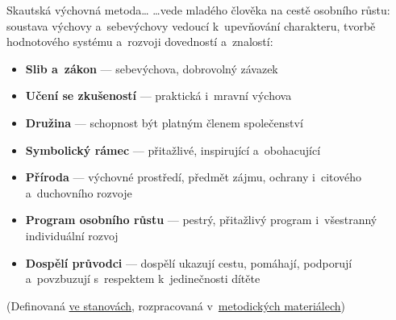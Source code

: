 \documentclass[compress, ucs, xelatex, xcolor=dvipsnames, print,
  hyperref={
    bookmarks=true,
    unicode=true,
    colorlinks=true,
    plainpages=false,
    pdfkeywords={Skaut, Junak, Skauting, Vychovna metoda},
    linkcolor=Black,
    anchorcolor=Black,
    citecolor=OliveGreen,
    filecolor=OliveGreen,
    menucolor=Black,
    urlcolor=OliveGreen,
    pdftex}
  ]{beamer}
\begin{document}
\begin{frame}{Skautská výchovná metoda\ldots}
  \ldots vede mladého člověka na cestě osobního růstu: soustava výchovy a~sebevýchovy vedoucí k~upevňování charakteru, tvorbě hodnotového systému a~rozvoji dovedností a~znalostí:
  \begin{itemize}
    \item \textbf{Slib a~zákon} --- sebevýchova, dobrovolný závazek
    \item \textbf{Učení se zkušeností} --- praktická i~mravní výchova
    \item \textbf{Družina} --- schopnost být platným členem společenství
    \item \textbf{Symbolický rámec} --- přitažlivé, inspirující a~obohacující
    \item \textbf{Příroda} --- výchovné prostředí, předmět zájmu, ochrany i~citového a~duchovního rozvoje
    \item \textbf{Program osobního růstu} --- pestrý, přitažlivý program i~všestranný individuální rozvoj
    \item \textbf{Dospělí průvodci} --- dospělí ukazují cestu, pomáhají, podporují a~povzbuzují s~respektem k~jedinečnosti dítěte
  \end{itemize}
  \begin{tiny}
    (Definovaná \href{https://krizovatka.skaut.cz/stredisko/administrativa/novy-obcansky-zakonik-stanovy/nove-stanovy}{ve stanovách}, rozpracovaná v~\href{https://krizovatka.skaut.cz/oddil/program/dle-vychovnych-kategorii}{metodických materiálech})
  \end{tiny}
\end{frame}
\end{document}
